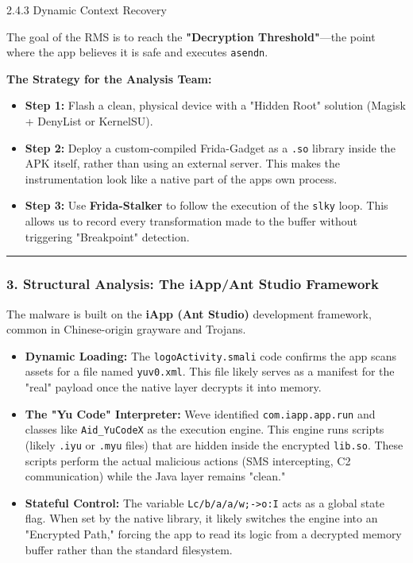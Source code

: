 \documentclass[
]{article}
\begin{document}
2.4.3 Dynamic Context Recovery

The goal of the RMS is to reach the \textbf{"Decryption
Threshold"}---the point where the app believes it is safe and executes
\texttt{asendn}.

\textbf{The Strategy for the Analysis Team:}

\begin{itemize}
\item
  \textbf{Step 1:} Flash a clean, physical device with a "Hidden Root"
  solution (Magisk + DenyList or KernelSU).
\item
  \textbf{Step 2:} Deploy a custom-compiled Frida-Gadget as a
  \texttt{.so} library inside the APK itself, rather than using an
  external server. This makes the instrumentation look like a native
  part of the app\textquotesingle s own process.
\item
  \textbf{Step 3:} Use \textbf{Frida-Stalker} to follow the execution of
  the \texttt{slky} loop. This allows us to record every transformation
  made to the buffer without triggering "Breakpoint" detection.
\end{itemize}

\begin{center}\rule{0.5\linewidth}{0.5pt}\end{center}

\subsubsection{3. Structural Analysis: The iApp/Ant Studio
Framework}\label{3-structural-analysis-the-iappant-studio-framework}

The malware is built on the \textbf{iApp (Ant Studio)} development
framework, common in Chinese-origin grayware and Trojans.

\begin{itemize}
\item
  \textbf{Dynamic Loading:} The \texttt{logoActivity.smali} code
  confirms the app scans assets for a file named \texttt{yuv0.xml}. This
  file likely serves as a manifest for the "real" payload once the
  native layer decrypts it into memory.
\item
  \textbf{The "Yu Code" Interpreter:} We\textquotesingle ve identified
  \texttt{com.iapp.app.run} and classes like \texttt{Aid\_YuCodeX} as
  the execution engine. This engine runs scripts (likely \texttt{.iyu}
  or \texttt{.myu} files) that are hidden inside the encrypted
  \texttt{lib.so}. These scripts perform the actual malicious actions
  (SMS intercepting, C2 communication) while the Java layer remains
  "clean."
\item
  \textbf{Stateful Control:} The variable
  \texttt{Lc/b/a/a/w;-\textgreater{}o:I} acts as a global state flag.
  When set by the native library, it likely switches the engine into an
  "Encrypted Path," forcing the app to read its logic from a decrypted
  memory buffer rather than the standard filesystem.
\end{itemize}
\end{document}
